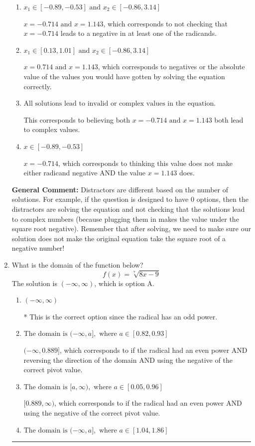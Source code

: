 \documentclass{extbook}[14pt]
\newcommand{\litem}[1]{\item #1

\rule{\textwidth}{0.4pt}}
\begin{document}
\begin{enumerate}
{\begin{enumerate}[label=\Alph*.]
* This is the correct option.
\item \( x_1 \in [-0.89, -0.53] \text{ and } x_2 \in [-0.86,3.14] \)

$x = -0.714 \text{ and } x = 1.143$, which corresponds to not checking that $x = -0.714$ leads to a negative in at least one of the radicands.
\item \( x_1 \in [0.13, 1.01] \text{ and } x_2 \in [-0.86,3.14] \)

$x = 0.714 \text{ and } x = 1.143$, which corresponds to negatives or the absolute value of the values you would have gotten by solving the equation correctly.
\item \( \text{All solutions lead to invalid or complex values in the equation.} \)

This corresponds to believing both $x = -0.714 \text{ and } x = 1.143$ both lead to complex values.
\item \( x \in [-0.89,-0.53] \)

$x = -0.714$, which corresponds to thinking this value does not make either radicand negative AND the value $x = 1.143$ does.
\end{enumerate}

\textbf{General Comment:} Distractors are different based on the number of solutions. For example, if the question is designed to have 0 options, then the distractors are solving the equation and not checking that the solutions lead to complex numbers (because plugging them in makes the value under the square root negative). Remember that after solving, we need to make sure our solution does not make the original equation take the square root of a negative number!
}
\litem{
What is the domain of the function below?
\[ f(x) = \sqrt[7]{8 x - 9} \]The solution is \( (-\infty, \infty) \), which is option A.\begin{enumerate}[label=\Alph*.]
\item \( (-\infty, \infty) \)

* This is the correct option since the radical has an odd power.
\item \( \text{The domain is } (-\infty, a], \text{   where } a \in [0.82, 0.93] \)

$(-\infty, 0.889]$, which corresponds to if the radical had an even power AND reversing the direction of the domain AND using the negative of the correct pivot value.
\item \( \text{The domain is } [a, \infty), \text{   where } a \in [0.05, 0.96] \)

$[0.889, \infty)$, which corresponds to if the radical had an even power AND using the negative of the correct pivot value.
\item \( \text{The domain is } (-\infty, a], \text{   where } a \in [1.04, 1.86] \)


\end{enumerate}}
\end{enumerate}
\end{document}

